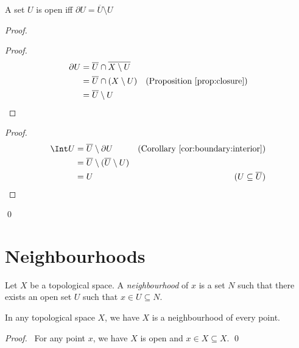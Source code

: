 \begin{prop}
  A set $U$ is open iff $\partial U = \overline{U} \setminus U$
\end{prop}

\begin{proof}
  \pf
  \begin{proof}
    \pf
    \begin{align*}
      \partial U & = \overline{U} \cap \overline{X \setminus U} \\
      & = \overline{U} \cap (X \setminus U) & (\text{Proposition \ref{prop:closure}})\\
      & = \overline{U} \setminus U
    \end{align*}
  \end{proof}
  \begin{proof}
    \pf
    \begin{align*}
      \Int U & = \overline{U} \setminus \partial U & (\text{Corollary \ref{cor:boundary:interior}})\\
      & = \overline{U} \setminus (\overline{U} \setminus U) \\
      & = U & (U \subseteq \overline{U})
    \end{align*}
  \end{proof}
  \qed
\end{proof}

\section{Neighbourhoods}

\begin{df}[Neighbourhood]
  Let $X$ be a topological space. A \emph{neighbourhood} of $x$ is a set $N$ such that there exists an open set $U$ such that $x \in U \subseteq N$.
\end{df}

\begin{prop}
\label{prop:neighbourhood:whole_space}
  In any topological space $X$, we have $X$ is a neighbourhood of every point.
\end{prop}

\begin{proof}
 \pf\ For any point $x$, we have $X$ is open and $x \in X \subseteq X$. \qed
\end{proof}

